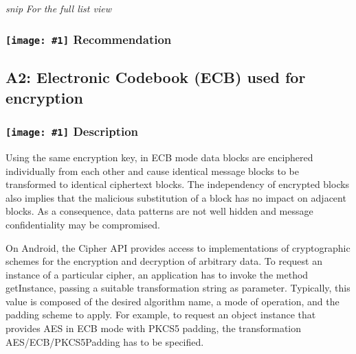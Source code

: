 \documentclass[12p]{article}
\newcommand{\icon}[1]{\texttt{[image: \#1]}}
\begin{document}



\textit{snip}
\newline \textsl{For the full list view }
\subsubsection*{\protect\icon{/home/miki/Documents/GITHUB/AndroidPermissions/python/vulns/report_icons/basic_todo.png} Recommendation}

\subsection{A2: Electronic Codebook (ECB) used for encryption}
\subsubsection*{\protect\icon{/home/miki/Documents/GITHUB/AndroidPermissions/python/vulns/report_icons/basic_sheet.png} Description}

            Using the same encryption key, in ECB mode data blocks are enciphered individually 
            from each other and cause identical message blocks to be transformed to identical ciphertext 
            blocks. The independency of encrypted blocks also implies that the malicious substitution of a 
            block has no impact on adjacent blocks. As a consequence, data patterns are not well hidden and 
            message confidentiality may be compromised.
            
            On Android, the Cipher API provides access to implementations of cryptographic schemes
            for the encryption and decryption of arbitrary data. To request an instance of a particular cipher,
            an application has to invoke the method getInstance, passing a suitable transformation string as
            parameter. Typically, this value is composed of the desired algorithm name, a mode of operation,
            and the padding scheme to apply. For example, to request an object instance that provides AES in
            ECB mode with PKCS5 padding, the transformation AES/ECB/PKCS5Padding has to be specified.
            
\end{document}
